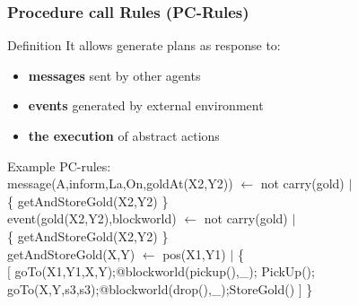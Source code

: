   \begin{frame}
    \frametitle{Procedure call Rules (PC-Rules)}
    \begin{block}{Definition}
      It allows generate plans as response to:
      \begin{itemize}
        \item \textbf{messages} sent by other agents 
        \item \textbf{events} generated by external environment 
        \item \textbf{the execution} of abstract actions
      \end{itemize}
    \end{block}
    
    \begin{block}{Example}{\small
      PC-rules:\\
      \tab message(A,inform,La,On,goldAt(X2,Y2)) $\leftarrow$  not carry(gold) $|$\\
      \tab \tab \tab \{ getAndStoreGold(X2,Y2) \}\\
      \tab event(gold(X2,Y2),blockworld) $\leftarrow$  not carry(gold) $|$\\
      \tab \tab \tab \{ getAndStoreGold(X2,Y2) \}\\ 
      \tab getAndStoreGold(X,Y) $\leftarrow$ pos(X1,Y1) $|$ \{ \\
      \tab \tab  $[$ goTo(X1,Y1,X,Y);@blockworld(pickup(),\_); PickUp(); \\
      \tab \tab  goTo(X,Y,s3,s3);@blockworld(drop(),\_);StoreGold() $]$ \} }
    \end{block}
  \end{frame}
